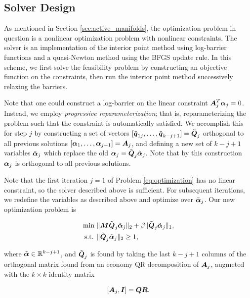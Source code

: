 \documentclass[]{aiaa-tc}%
\begin{document}
\subsection{Solver Design} \label{sec:solver_design}
As mentioned in Section \ref{sec:active_manifolds}, the optimization problem in question is a nonlinear optimization problem with nonlinear constraints. The solver is an implementation of the interior point method using log-barrier functions and a quasi-Newton method using the BFGS update rule.\cite{Chandrupatla1999} In this scheme, we first solve the feasibility problem by constructing an objective function on the constraints, then run the interior point method successively relaxing the barriers.

Note that one could construct a log-barrier on the linear constraint $\boldsymbol{A}^T_j\boldsymbol{\alpha}_j=0$. Instead, we employ \emph{progressive reparameterization}; that is, reparameterizing the problem such that the constraint is automatically satisfied. We accomplish this for step $j$ by constructing a set of vectors $[\tilde{\boldsymbol{q}}_{1j},\dots,\tilde{\boldsymbol{q}}_{k-j+1}]=\tilde{\boldsymbol{Q}}_j$ orthogonal to all previous solutions $[\boldsymbol{\alpha}_1,\dots,\boldsymbol{\alpha}_{j-1}]=\boldsymbol{A}_j$, and defining a new set of $k-j+1$ variables $\tilde{\boldsymbol{\alpha}}_j$ which replace the old $\boldsymbol{\alpha}_j=\tilde{\boldsymbol{Q}}_j\tilde{\boldsymbol{\alpha}}_j$. Note that by this construction $\boldsymbol{\alpha}_j$ is orthogonal to all previous solutions.

Note that the first iteration $j=1$ of Problem \ref{eq:optimization} has no linear constraint, so the solver described above is sufficient. For subsequent iterations, we redefine the variables as described above and optimize over $\tilde{\boldsymbol{\alpha}}_j$. Our new optimization problem is

\begin{equation}
\begin{aligned}
\label{eq:optimization_reparam}
\text{min  }& \|\boldsymbol{M}\tilde{\boldsymbol{Q}}_j\tilde{\boldsymbol{\alpha}}_j\|_2 + \beta\|\tilde{\boldsymbol{Q}}_j\tilde{\boldsymbol{\alpha}}_j\|_1, \\
\text{s.t. }& \|\tilde{\boldsymbol{Q}}_j\tilde{\boldsymbol{\alpha}}_j\|_2\geq1,
\end{aligned}
\end{equation}

where $\tilde{\boldsymbol{\alpha}}\in\mathbb{R}^{k-j+1}$, and $\tilde{\boldsymbol{Q}}_j$ is found by taking the last $k-j+1$ columns of the orthogonal matrix found from an economy QR decomposition of $\boldsymbol{A}_j$, augmeted with the $k\times k$ identity matrix

\begin{equation}
\label{eq:augmeted_matrix}
[\boldsymbol{A}_j,\boldsymbol{I}] = \boldsymbol{Q}\boldsymbol{R}.
\end{equation}
\end{document}
